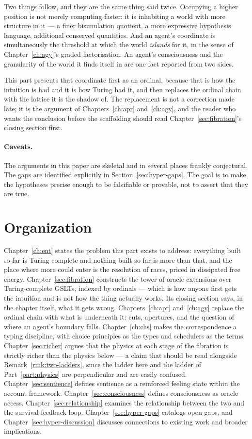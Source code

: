 Two things follow, and they are the same thing said twice.
Occupying a higher position is not merely computing faster: it is
inhabiting a world with more structure in it --- a finer bisimulation
quotient, a more expressive hypothesis language, additional conserved
quantities.
And an agent's coordinate is simultaneously the threshold at which the
world \emph{islands} for it, in the sense of
Chapter~\ref{ch:agy}'s graded factorisation.
An agent's consciousness and the granularity of the world it finds
itself in are one fact reported from two sides.

This part presents that coordinate first as an ordinal, because that is
how the intuition is had and it is how Turing had it, and then replaces
the ordinal chain with the lattice it is the shadow of.
The replacement is not a correction made late; it is the argument of
Chapters~\ref{ch:apr} and~\ref{ch:agy}, and the reader who wants the
conclusion before the scaffolding should read
Chapter~\ref{sec:fibration}'s closing section first.

\paragraph{Caveats.}
The arguments in this paper are skeletal and in several places
frankly conjectural.
The gaps are identified explicitly in Section~\ref{sec:hyper-gaps}.
The goal is to make the hypotheses precise enough to be falsifiable
or provable, not to assert that they are true.

\section{Organization}

Chapter~\ref{ch:ent} states the problem this part exists to address:
everything built so far is Turing complete and nothing built so far is
more than that, and the place where more could enter is the resolution of
races, priced in dissipated free energy.
Chapter~\ref{sec:fibration} constructs the tower of oracle extensions
over Turing-complete GSLTs, indexed by ordinals --- which is how anyone
first gets the intuition and is not how the thing actually works.
Its closing section says, in the chapter itself, what it gets wrong.
Chapters~\ref{ch:apr} and~\ref{ch:agy} replace the ordinal chain with
what is underneath it: cuts, apertures, and the question of where an
agent's boundary falls.
Chapter~\ref{ch:chs} makes the correspondence a typing discipline, with
choice principles as the types and schedulers as the terms.
Chapter~\ref{sec:richer} argues that the physics at each stage of the
fibration is strictly richer than the physics below --- a claim that
should be read alongside Remark~\ref{rmk:two-ladders}, since the ladder
here and the ladder of Part~\ref{part:physics} are perpendicular and are
easily confused.
Chapter~\ref{sec:sentience} defines sentience as a reinforced feeling
state within the account framework.
Chapter~\ref{sec:consciousness} defines consciousness as oracle access.
Chapter~\ref{sec:relationship} examines the relationship between the two
and the survival feedback loop.
Chapter~\ref{sec:hyper-gaps} catalogs open gaps, and
Chapter~\ref{sec:hyper-discussion} discusses connections to existing work
and broader implications.

